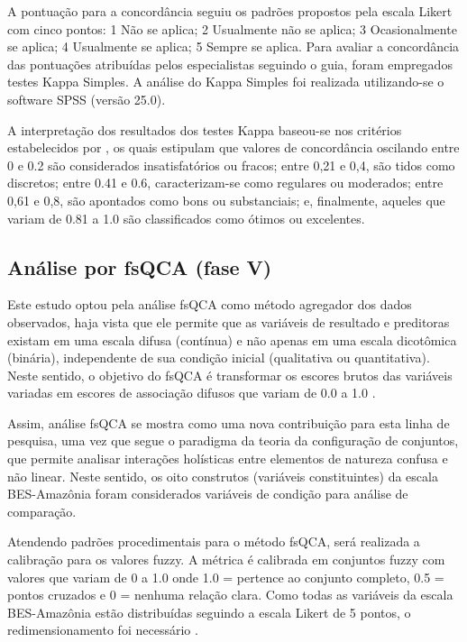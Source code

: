 A pontuação para a concordância seguiu os padrões propostos pela escala Likert com cinco pontos: 1 Não se aplica; 2 Usualmente não se aplica; 3 Ocasionalmente se aplica; 4 Usualmente se aplica; 5 Sempre se aplica. Para avaliar a concordância das pontuações atribuídas pelos especialistas seguindo o guia, foram empregados testes Kappa Simples. A análise do Kappa Simples foi realizada utilizando-se o software SPSS (versão 25.0).

A interpretação dos resultados dos testes Kappa baseou-se nos critérios estabelecidos por , os quais estipulam que valores de concordância oscilando entre 0 e 0.2 são considerados insatisfatórios ou fracos; entre 0,21 e 0,4, são tidos como discretos; entre 0.41 e 0.6, caracterizam-se como regulares ou moderados; entre 0,61 e 0,8, são apontados como bons ou substanciais; e, finalmente, aqueles que variam de 0.81 a 1.0 são classificados como ótimos ou excelentes.


\subsection{Análise por fsQCA (fase V)}

Este estudo optou pela análise fsQCA como método agregador dos dados observados, haja vista que ele permite que as variáveis de resultado e preditoras existam em uma escala difusa (contínua) e não apenas em uma escala dicotômica (binária), independente de sua condição inicial (qualitativa ou quantitativa). Neste sentido, o objetivo do fsQCA é transformar os escores brutos das variáveis variadas em escores de associação difusos que variam de 0.0 a 1.0 \cite{Wu2019IdentifyingApproachb}.

Assim, análise fsQCA se mostra como uma nova contribuição para esta linha de pesquisa, uma vez que segue o paradigma da teoria da configuração de conjuntos, que permite analisar interações holísticas entre elementos de natureza confusa e não linear. Neste sentido, os oito construtos (variáveis constituintes) da escala BES-Amazônia foram considerados variáveis de condição para análise de comparação.

Atendendo padrões procedimentais para o método fsQCA, será realizada a calibração para os valores fuzzy. A métrica é calibrada em conjuntos fuzzy com valores que variam de 0 a 1.0 onde 1.0 = pertence ao conjunto completo, 0.5 = pontos cruzados e 0 = nenhuma relação clara. Como todas as variáveis da escala BES-Amazônia estão distribuídas seguindo a escala Likert de 5 pontos, o redimensionamento foi necessário \cite{Chang2014HowSatisfaction}. 

